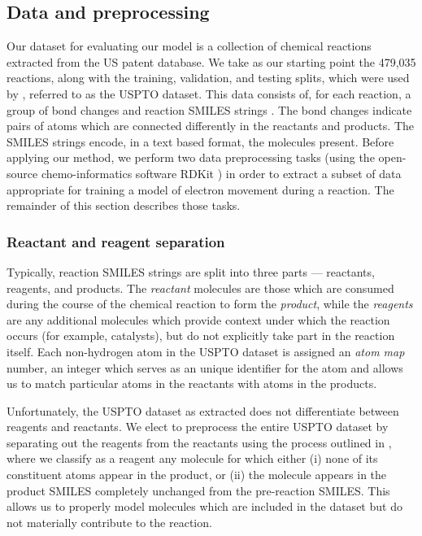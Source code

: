 
\subsection{Data and preprocessing}

Our dataset for evaluating our model is a collection of chemical reactions extracted from the US patent database.
We take as our starting point the 479,035 reactions, along with the training, validation, and testing splits, 
which were used by \citet{jin2017predicting}, referred to as the USPTO dataset.
This data consists of, for each reaction, a group of bond changes and reaction SMILES strings \citep{weininger1988smiles}.
The bond changes indicate pairs of atoms which are connected differently in the reactants and products.
The SMILES strings encode, in a text based format, the molecules present.
Before applying our method, we perform two data preprocessing tasks (using the open-source chemo-informatics software RDKit
  \citep{rdkit}) in order to extract a subset of data appropriate for training a
 model of electron movement during a reaction. The remainder of this section describes those tasks.

\subsubsection{Reactant and reagent separation}

Typically, reaction SMILES strings are split into three parts --- reactants, reagents, and products.
The {\em reactant} molecules are those which are consumed during the course of the chemical reaction to form the {\em product}, 
while the {\em reagents} are any additional molecules which provide context under which the reaction occurs (for example, catalysts),
but do not explicitly take part in the reaction  itself.
Each non-hydrogen atom in the USPTO dataset is assigned an {\em atom map} number, an integer which serves as an unique identifier for the atom and allows us to match particular atoms in the reactants with atoms in the products.

Unfortunately, the USPTO dataset as extracted does not differentiate between reagents and reactants.
We elect to preprocess the entire USPTO dataset by separating out the reagents from the reactants using the process outlined in \citet{schwaller2017found}, where we classify as a reagent any molecule for which either 
(i) none of its constituent atoms appear in the product, or 
(ii) the molecule appears in the product SMILES completely unchanged from the pre-reaction SMILES.
This allows us to properly model molecules which are included in the dataset but do not materially contribute to the reaction.

